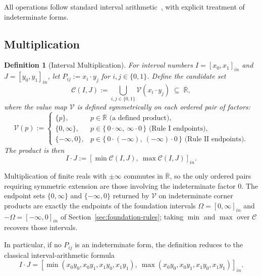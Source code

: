 \documentclass[11pt,a4paper]{article}
\theoremstyle{paperdef}
\newtheorem{definition}[theorem]{Definition}
\newcommand{\Rext}{\overline{\mathbb{R}}}
\newcommand{\inI}[1]{[#1]_{in}}
\newcommand{\V}{\mathcal{V}}
\newcommand{\Cand}{\mathcal{C}}
\begin{document}
All operations follow standard interval arithmetic~\cite{Moore1966},
with explicit treatment of indeterminate forms.

\subsection{Multiplication}\label{sec:multiplication}

\begin{definition}[Interval Multiplication]\label{def:multiplication}
For interval numbers $I = \inI{x_0, x_1}$ and $J = \inI{y_0, y_1}$,
let $P_{ij} := x_i \cdot y_j$ for $i, j \in \{0, 1\}$. Define the
\emph{candidate set}
\[
\Cand(I, J) := \bigcup_{i,j \in \{0,1\}} \V(x_i \cdot y_j)
\;\subseteq\; \Rext,
\]
where the \emph{value map} $\V$ is defined symmetrically on each
ordered pair of factors:
\[
\V(p) := \begin{cases}
\{p\}, & p \in \Rext \text{ (a defined product)}, \\
\{0, \infty\}, & p \in \{\,0 \cdot \infty,\ \infty \cdot 0\,\} \text{ (Rule I endpoints)}, \\
\{-\infty, 0\}, & p \in \{\,0 \cdot (-\infty),\ (-\infty) \cdot 0\,\} \text{ (Rule II endpoints)}.
\end{cases}
\]
The product is then
\[
I \cdot J := \inI{\min \Cand(I, J),\ \max \Cand(I, J)}.
\]
\end{definition}

Multiplication of finite reals with $\pm\infty$ commutes in $\Rext$,
so the only ordered pairs requiring symmetric extension are those
involving the indeterminate factor $0$. The endpoint sets
$\{0, \infty\}$ and $\{-\infty, 0\}$ returned by $\V$ on
indeterminate corner products are exactly the endpoints of the
foundation intervals $\Omega = \inI{0, \infty}$ and
$-\Omega = \inI{-\infty, 0}$ of Section~\ref{sec:foundation-rules};
taking $\min$ and $\max$ over $\Cand$ recovers those intervals.

In particular, if no $P_{ij}$ is an indeterminate form, the
definition reduces to the classical interval-arithmetic formula
\[
I \cdot J = \inI{\min(x_0 y_0, x_0 y_1, x_1 y_0, x_1 y_1),\
\max(x_0 y_0, x_0 y_1, x_1 y_0, x_1 y_1)}.
\]
\end{document}
